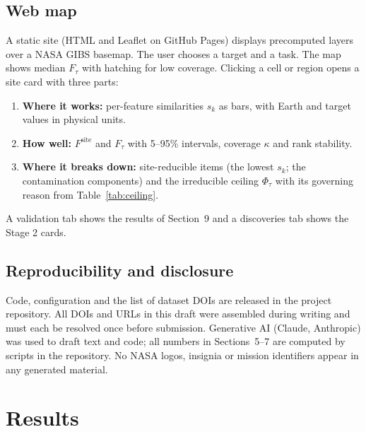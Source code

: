 \documentclass[11pt,a4paper]{article}
\begin{document}
\subsection{Web map}
A static site (HTML and Leaflet on GitHub Pages) displays precomputed layers over a NASA GIBS basemap. The user chooses a target and a task. The map shows median $F_\tau$ with hatching for low coverage. Clicking a cell or region opens a site card with three parts:
\begin{enumerate}
\item \textbf{Where it works:} per-feature similarities $s_k$ as bars, with Earth and target values in physical units.
\item \textbf{How well:} $F^{\mathrm{site}}$ and $F_\tau$ with 5--95\% intervals, coverage $\kappa$ and rank stability.
\item \textbf{Where it breaks down:} site-reducible items (the lowest $s_k$; the contamination components) and the irreducible ceiling $\Phi_\tau$ with its governing reason from Table~\ref{tab:ceiling}.
\end{enumerate}
A validation tab shows the results of Section~9 and a discoveries tab shows the Stage 2 cards.

\subsection{Reproducibility and disclosure}
Code, configuration and the list of dataset DOIs are released in the project repository. All DOIs and URLs in this draft were assembled during writing and must each be resolved once before submission. Generative AI (Claude, Anthropic) was used to draft text and code; all numbers in Sections~5--7 are computed by scripts in the repository. No NASA logos, insignia or mission identifiers appear in any generated material.

\section{Results}
\end{document}
